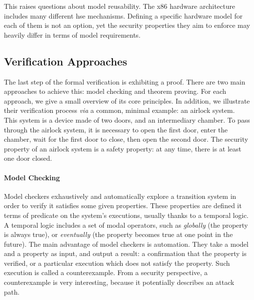 This raises questions about model reusability.
%
The x86 hardware architecture includes many different \ac{hse} mechanisms.
%
Defining a specific hardware model for each of them is not an option, yet the
security properties they aim to enforce may heavily differ in terms of model
requirements. 

\subsection{Verification Approaches}
\label{subsec:state:approaches}

The last step of the formal verification is exhibiting a proof.
%
There are two main approaches to achieve this: model checking and theorem
proving. 
%
For each approach, we give a small overview of its core principles.
%
In addition, we illustrate their verification process \emph{via} a common,
minimal example: an airlock system.
%
This system is a device made of two doors, and an intermediary chamber. 
%
To pass through the airlock system, it is necessary to open the first door,
enter the chamber, wait for the first door to close, then open the second door.
%
The security property of an airlock system is a safety property: at any time,
there is at least one door closed.

\paragraph{Model Checking}
%


Model checkers exhaustively and automatically explore a transition system in
order to verify it satisfies some given properties.
%
These properties are defined it terms of predicate on the system's executions,
usually thanks to a temporal logic.
%
A temporal logic includes a set of modal operators, such as \emph{globally} (the
property is always true), or \emph{eventually} (the property becomes true at one
point in the future).
%
The main advantage of model checkers is automation.
%
They take a model and a property as input, and output a result: a confirmation
that the property is verified, or a particular execution which does not satisfy
the property.
%
Such execution is called a counterexample.
%
From a security perspective, a counterexample is very interesting, because it
potentially describes an attack path.

